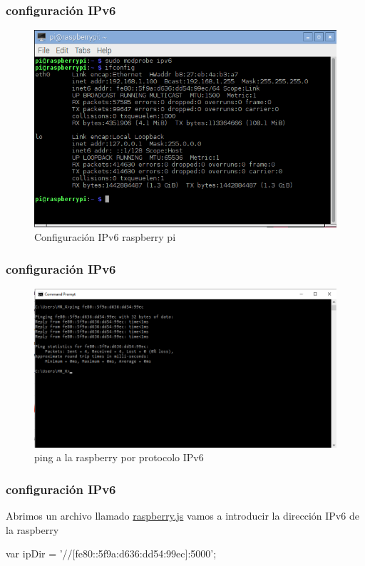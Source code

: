 \documentclass[10pt]{beamer}\usepackage[]{graphicx}\usepackage[]{color}
\begin{document}
\begin{frame}
\frametitle{configuración IPv6}
		\begin{figure}[H] 
			\centering
			\includegraphics[scale=0.3]{ip6_1}   %
			\caption{Configuración IPv6 raspberry pi}	
		\end{figure}
\end{frame}

\begin{frame}
	\frametitle{configuración IPv6}
		\begin{figure}[H] 
			\centering
			\includegraphics[scale=0.4]{ip6_2}  
			\caption{ping a la raspberry por protocolo IPv6 }	
		\end{figure}
\end{frame}

\begin{frame}
	\frametitle{configuración IPv6}
Abrimos un archivo llamado \href{https://github.com/wilrilo/repo_final_nube/blob/master/repo_final_nube/ProyectoF_Pi/static/scripts/raspberry.js}{raspberry.js} vamos a introducir la dirección IPv6 de la raspberry\\
\begin{center}
var ipDir = '//[fe80::5f9a:d636:dd54:99ec]:5000';	
\end{center}

\end{frame}
\end{document}
